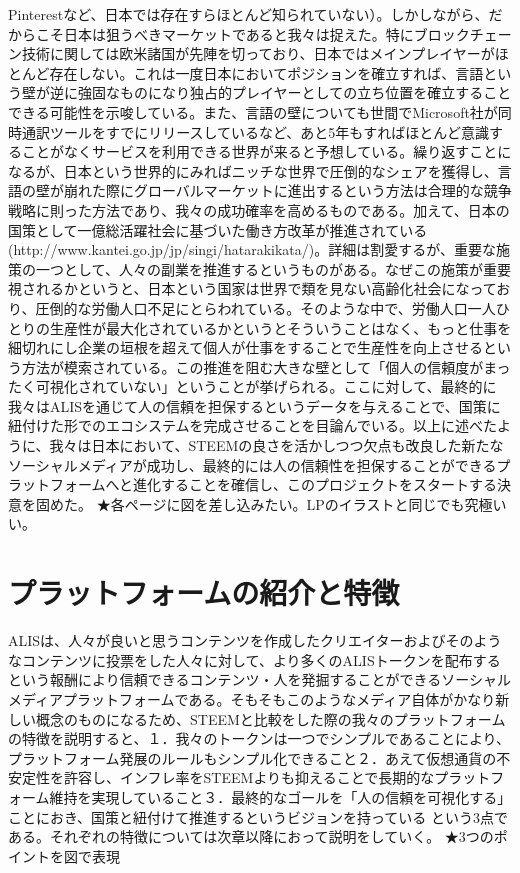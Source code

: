 \documentclass{jsarticle}
\begin{document}
Pinterestなど、日本では存在すらほとんど知られていない）。しかしながら、だからこそ日本は狙うべきマーケットであると我々は捉えた。特にブロックチェーン技術に関しては欧米諸国が先陣を切っており、日本ではメインプレイヤーがほとんど存在しない。これは一度日本においてポジションを確立すれば、言語という壁が逆に強固なものになり独占的プレイヤーとしての立ち位置を確立することできる可能性を示唆している。また、言語の壁についても世間でMicrosoft社が同時通訳ツールをすでにリリースしているなど、あと5年もすればほとんど意識することがなくサービスを利用できる世界が来ると予想している。繰り返すことになるが、日本という世界的にみればニッチな世界で圧倒的なシェアを獲得し、言語の壁が崩れた際にグローバルマーケットに進出するという方法は合理的な競争戦略に則った方法であり、我々の成功確率を高めるものである。加えて、日本の国策として一億総活躍社会に基づいた働き方改革が推進されている(http://www.kantei.go.jp/jp/singi/hatarakikata/)。詳細は割愛するが、重要な施策の一つとして、人々の副業を推進するというものがある。なぜこの施策が重要視されるかというと、日本という国家は世界で類を見ない高齢化社会になっており、圧倒的な労働人口不足にとらわれている。そのような中で、労働人口一人ひとりの生産性が最大化されているかというとそういうことはなく、もっと仕事を細切れにし企業の垣根を超えて個人が仕事をすることで生産性を向上させるという方法が模索されている。この推進を阻む大きな壁として「個人の信頼度がまったく可視化されていない」ということが挙げられる。ここに対して、最終的に我々はALISを通じて人の信頼を担保するというデータを与えることで、国策に紐付けた形でのエコシステムを完成させることを目論んでいる。以上に述べたように、我々は日本において、STEEMの良さを活かしつつ欠点も改良した新たなソーシャルメディアが成功し、最終的には人の信頼性を担保することができるプラットフォームへと進化することを確信し、このプロジェクトをスタートする決意を固めた。
★各ページに図を差し込みたい。LPのイラストと同じでも究極いい。
\section{プラットフォームの紹介と特徴}
ALISは、人々が良いと思うコンテンツを作成したクリエイターおよびそのようなコンテンツに投票をした人々に対して、より多くのALISトークンを配布するという報酬により信頼できるコンテンツ・人を発掘することができるソーシャルメディアプラットフォームである。そもそもこのようなメディア自体がかなり新しい概念のものになるため、STEEMと比較をした際の我々のプラットフォームの特徴を説明すると、１．我々のトークンは一つでシンプルであることにより、プラットフォーム発展のルールもシンプル化できること２．あえて仮想通貨の不安定性を許容し、インフレ率をSTEEMよりも抑えることで長期的なプラットフォーム維持を実現していること３．最終的なゴールを「人の信頼を可視化する」ことにおき、国策と紐付けて推進するというビジョンを持っている という3点である。それぞれの特徴については次章以降におって説明をしていく。
★3つのポイントを図で表現
\end{document}
